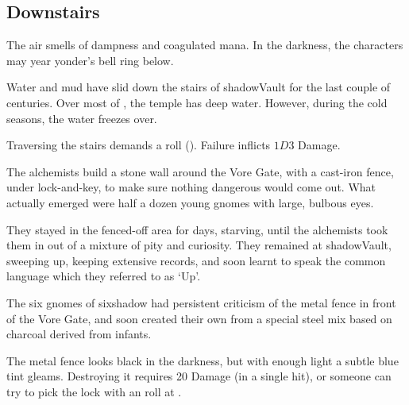 \begin{multicols}{2}
\subsection[Downstairs]{\quad Downstairs\quad{}}

The air smells of dampness and coagulated mana.
In the darkness, the characters may year \gls{yonder}'s bell ring below.


\begin{exampletext}
  Water and mud have slid down the stairs of \gls{shadowVault} for the last couple of centuries.
  Over most of , the temple has deep water.
  However, during the cold seasons, the water freezes over.
\end{exampletext}

Traversing the stairs demands a  roll (\tn[8]).
Failure inflicts $1D3$ Damage.



\begin{exampletext}
  The alchemists build a stone wall around the Vore Gate, with a cast-iron fence, under lock-and-key, to make sure nothing dangerous would come out.
  What actually emerged were half a dozen young gnomes with large, bulbous eyes.

  They stayed in the fenced-off area for days, starving, until the alchemists took them in out of a mixture of pity and curiosity.
  They remained at \gls{shadowVault}, sweeping up, keeping extensive records, and soon learnt to speak the common language which they referred to as `Up'.

  The six gnomes of \gls{sixshadow} had persistent criticism of the metal fence in front of the Vore Gate, and soon created their own from a special steel mix based on charcoal derived from  infants.
\end{exampletext}

The metal fence looks black in the darkness, but with enough light a subtle blue tint gleams.
Destroying it requires 20 Damage (in a single hit), or someone can try to pick the lock with an  roll at \tn[16].

\shadowVaultMap



\end{multicols}
